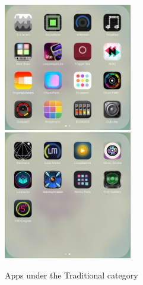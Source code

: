 \bigskip
\begin{figure}[h]
  \includegraphics[width=0.50\textwidth]{images/Traditional1.png}
  \includegraphics[width=0.50\textwidth]{images/Traditional2.png}
  \caption{Apps under the Traditional category}
  \label{fig: Traditional}
\end{figure}
\bigskip

\clearpage
